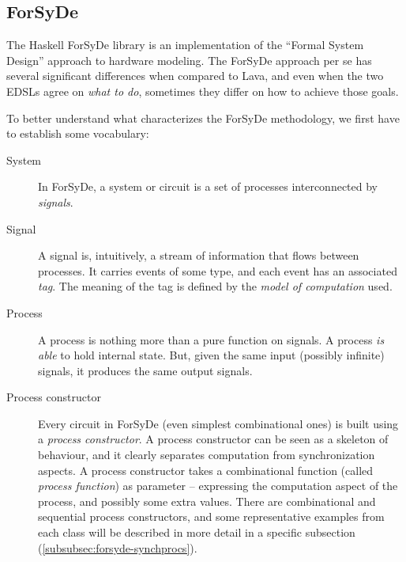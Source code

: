     \subsection{ForSyDe}
    \label{subsec:forsyde}
        The Haskell ForSyDe library is an implementation of the ``Formal System Design'' approach to
        hardware modeling\cite{forsyde1999}. The ForSyDe approach per se has several significant
        differences when compared to Lava, and even when the two EDSLs agree on \emph{what to do},
        sometimes they differ on how to achieve those goals.

        To better understand what characterizes the ForSyDe methodology, we first have to establish
        some vocabulary:

        \begin{description}
            \item[System] In ForSyDe, a system or circuit is a set of processes interconnected by
                \emph{signals}.

            \item[Signal] A signal is, intuitively, a stream of information that flows between
                processes. It carries events of some type, and each event has an associated
                \emph{tag}. The meaning of the tag is defined by the \emph{model of computation}
                used.

            \item[Process] A process is nothing more than a pure function on signals. A process
                \emph{is able} to hold internal state. But, given the same input (possibly infinite)
                signals, it produces the same output signals.

            \item[Process constructor] Every circuit in ForSyDe (even simplest combinational ones) is
                built using a \emph{process constructor}. A process constructor can be seen as a
                skeleton of behaviour, and it clearly separates computation from synchronization
                aspects. A process constructor takes a combinational function (called \emph{process
                    function}) as parameter -- expressing the computation aspect of the process, and
                possibly some extra values. There are combinational and sequential process
                constructors, and some representative examples from each class will be described in
                more detail in a specific subsection (\ref{subsubsec:forsyde-synchprocs}).
        \end{description}

